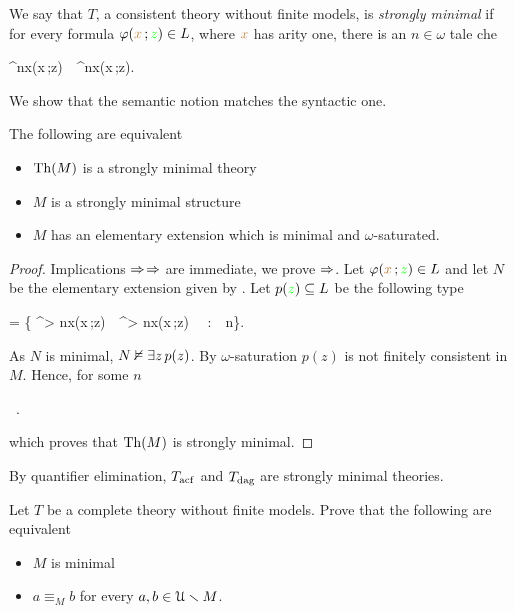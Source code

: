 We say that $T$, a consistent theory without finite models, is \emph{strongly minimal\/} if 
for every formula $\varphi({\color{brown} x}\,;{\color{green} z})\in L$, where ${\color{brown} x}$ has arity one, there is an  $n\in\omega$ tale che

{\proves}
{\E^{\le n}{\mr x}\;\phi({\mr x}\,;{\gr z})\ \vee\ \E^{\le n}{\mr x}\;\neg\phi({\mr x}\,;{\gr z}).}

We show that the semantic notion matches the syntactic one.

\begin{proposition}\label{prop_fmequivalenzadefinizioni}
The following are equivalent
\begin{itemize}
\item[1.] ${\rm Th}(M)$ is a strongly minimal theory
\item[2.] $M$ is a strongly minimal structure
\item[3.] $M$ has an elementary extension which is minimal and $\omega$-saturated.
\end{itemize}
\end{proposition}
\begin{proof}
Implications $\Rightarrow$$\Rightarrow$ are immediate, we prove $\Rightarrow$.
Let $\varphi({\color{brown} x}\,;{\color{green} z})\in L$ and let $N$ be the elementary extension given by .
Let $p({\color{green} z})\subseteq L$ be the following type

{=}
{\Big\{ \E^{> n}{\mr x}\;\phi({\mr x}\,;{\gr z})\ \wedge\ \E^{> n}{\mr x}\;\neg\phi({\mr x}\,;{\gr z}) \ \ :\ \ n\in\omega\Big\}.}

As $N$ is minimal, $N\nvDash \exists z\,p(z)$.
By $\omega$-saturation $p(z)$ is not finitely consistent in $M$.
Hence, for some $n$ 

{\models}
{\ .}

which proves that ${\rm Th}(M)$ is strongly minimal.
\end{proof}

By quantifier elimination, $T_{\rm acf}$ and $T_{\rm dag}$ are strongly minimal theories.

\begin{exercise}\label{ex_minimal_models}
Let $T$ be a complete theory without finite models.
Prove that the following are equivalent
\begin{itemize}
\item[1.] $M$ is minimal
\item[2.] $a\equiv_M b$ for every $a, b\in \EuScript U\smallsetminus M$.
\end{itemize}
\end{exercise}




